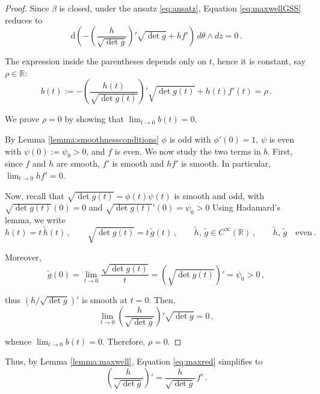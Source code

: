 \documentclass[12pt,a4paper,reqno]{amsart}
\theoremstyle{plain}
\theoremstyle{remark}
\numberwithin{equation}{section}
\newcommand{\dd}{\mathrm{d}}
\newcommand{\R}{\mathbb{R}}
\begin{document}
\begin{proof}
Since $\beta$ is closed, under the ansatz \eqref{eq:ansatz}, Equation \eqref{eq:maxwellGSS} reduces to
\begin{equation*}
\dd\left( -\left(\frac{h}{\sqrt{\det g}}\right)' \sqrt{\det g} + h f' \right) \, d\theta\wedge dz = 0 \,.
\end{equation*}

The expression inside the parentheses depends only on $t$, hence it is constant, say $\rho\in\R$:
\begin{equation}\label{eq:integmaxwellGSS}
b(t) := - \left(\frac{h(t)}{\sqrt{\det g(t)}}\right)' \sqrt{\det g(t)} + h(t) f'(t) = \rho \,.
\end{equation}

We prove $\rho=0$ by showing that $\lim_{t\to0}b(t)=0$.

By Lemma \ref{lemma:smoothnessconditions} $\phi$ is odd with $\phi'(0)=1$, $\psi$ is even with $\psi(0):=\psi_0>0$, and $f$ is even. We now study the two terms in $b$. First, since $f$ and $h$ are smooth, $f'$ is smooth and $hf'$ is smooth. In particular, $\lim_{t\to0}hf'=0$.

Now, recall that $\sqrt{\det g(t)} = \phi(t)\psi(t)$ is smooth and odd, with $\sqrt{\det g(t)}(0)=0$ and $\sqrt{\det g(t)}'(0)=\psi_0>0$ Using Hadamard's lemma, we write
\begin{equation*}
h(t) = t \,\tilde{h}(t) \,, \qquad \sqrt{\det g(t)} = t \,\tilde{g}(t) \,, \qquad \tilde{h}, \,\tilde{g} \in C^\infty(\R) \,, \qquad \tilde{h}, \,\tilde{g} \quad \text{even} \,.
\end{equation*}

Moreover,
\begin{equation*}
\tilde{g}(0) = \lim_{t\to0}\frac{\sqrt{\det g(t)}}{t} = (\sqrt{\det g(t)})' = \psi_0 > 0 \,,
\end{equation*}

thus $\left(h/\sqrt{\det g}\right)'$ is smooth at $t=0$. Then,
\begin{equation*}
\lim_{t\to0}\left(\frac{h}{\sqrt{\det g}}\right)'\sqrt{\det g} = 0 \,,
\end{equation*}

whence $\lim_{t\to0}b(t)=0$. Therefore, $\rho=0$.
\end{proof}

Thus, by Lemma \ref{lemma:maxwell}, Equation \eqref{eq:maxred} simplifies to
\begin{equation*}
\left(\frac{h}{\sqrt{\det g}}\right)' = \frac{h}{\sqrt{\det g}}\, f' \,.
\end{equation*}
\end{document}
